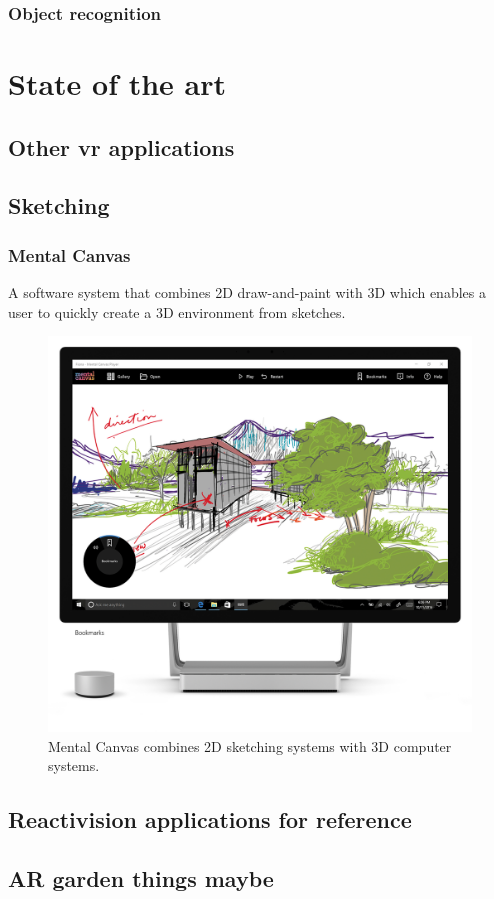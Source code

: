 			\subsubsection{Object recognition}

    \section{State of the art}\label{sec:SOTA}
		\subsection{Other vr applications}
		
		\subsection{Sketching}
		 \subsubsection{Mental Canvas}
			A software system that combines 2D draw-and-paint with 3D which enables a user to quickly create a 3D environment from sketches. %
			
           \begin{multicols}{2}
				\begin{figure}[H]
					\centering
					\includegraphics[width=0.6\linewidth]{figure/Analysis/mentalCanvas.png}
					\caption{Mental Canvas combines 2D sketching systems with 3D computer systems.}
					\label{fig:mentalCanvas}
				\end{figure}
				\columnbreak
			\end{multicols}
			
			\cite{sotaMentalCanvas}

		
		\subsection{Reactivision applications for reference}
		
		\subsection{AR garden things maybe}
		